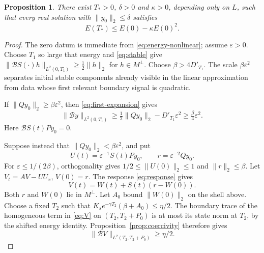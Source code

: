\documentclass[11pt]{article}
\newtheorem{proposition}[theorem]{Proposition}
\theoremstyle{remark}\newtheorem{remark}[theorem]{Remark}
\numberwithin{equation}{section}
\begin{document}
\begin{proposition}\label{prop:loss}
There exist $T_*>0$, $\delta>0$ and $\kappa>0$, depending only on $L$,
such that every real solution with $\|y_0\|_2\le\delta$ satisfies
\begin{equation}\label{eq:loss}
 E(T_*)\le E(0)-\kappa E(0)^2.
\end{equation}
\end{proposition}
\begin{proof}
The zero datum is immediate from \eqref{eq:energy-nonlinear}; assume
$\varepsilon>0$. Choose $T_1$ so large that energy and \eqref{eq:stable} give
$\|\mathcal BS(\cdot)h\|_{L^2(0,T_1)}\ge\frac12\|h\|_2$ for $h\in M^\perp$.
Choose $\beta>4D'_{T_1}$. The scale $\beta\varepsilon^2$ separates initial
stable components already visible in the linear approximation from data whose
first relevant boundary signal is quadratic.

If $\|Qy_0\|_2\ge\beta\varepsilon^2$, then \eqref{eq:first-expansion} gives
\begin{equation}\label{eq:case-one}
 \|\mathcal By\|_{L^2(0,T_1)}
 \ge\tfrac12\|Qy_0\|_2-D'_{T_1}\varepsilon^2
 \ge\tfrac\beta4\varepsilon^2.
\end{equation}
Here $\mathcal BS(t)Py_0=0$.

Suppose instead that $\|Qy_0\|_2<\beta\varepsilon^2$, and put
\[
 U(t)=\varepsilon^{-1}S(t)Py_0,\qquad r=\varepsilon^{-2}Qy_0.
\]
For $\varepsilon\le1/(2\beta)$, orthogonality gives
$1/2\le\|U(0)\|_2\le1$ and $\|r\|_2\le\beta$.
Let $V_t=AV-UU_x$, $V(0)=r$. The response \eqref{eq:response} gives
\begin{equation}\label{eq:V}
 V(t)=W(t)+S(t)(r-W(0)).
\end{equation}
Both $r$ and $W(0)$ lie in $M^\perp$.
Let $A_0$ bound $\|W(0)\|_2$ on the shell above.
Choose a fixed $T_2$ such that
$K_s e^{-\gamma T_2}(\beta+A_0)\le\eta/2$.
The boundary trace of the homogeneous term in \eqref{eq:V} on
$(T_2,T_2+P_0)$ is at most its state norm at $T_2$, by the shifted energy
identity. Proposition~\ref{prop:coercivity} therefore gives
\begin{equation}\label{eq:V-trace}
 \|\mathcal BV\|_{L^2(T_2,T_2+P_0)}\ge\eta/2.
\end{equation}


\end{proof}
\end{document}
